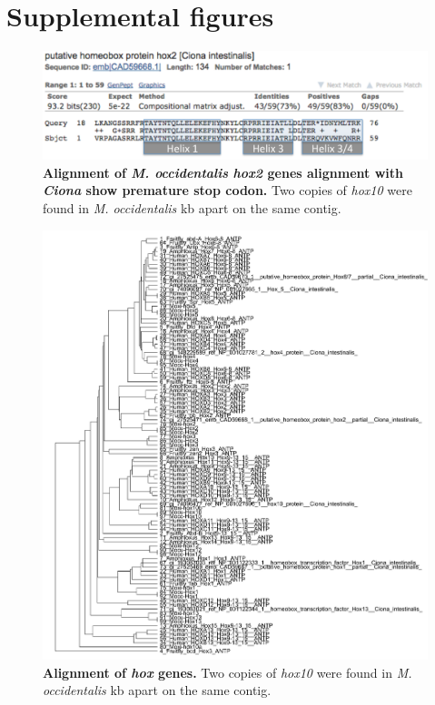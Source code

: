 \chapter{Supplemental figures}
\begin{figure}[thbp]
\centering
\includegraphics[scale=0.75]{figures/occi_hox2.pdf}
\caption{\textbf{Alignment of \textit{M. occidentalis} \textit{hox2} genes alignment with \textit{Ciona} show  premature stop codon.} Two copies of \textit{hox10} were found in \textit{M. occidentalis}  kb apart on the same contig.}
\label{fig:occihox2}
\end{figure}

\begin{figure}[tbp]
\centering
\includegraphics[scale=0.85]{figures/hox_alignment.pdf}
\caption{\textbf{Alignment of \textit{hox} genes.} Two copies of \textit{hox10} were found in \textit{M. occidentalis}  kb apart on the same contig.}
\label{fig:hox-alignments}
\end{figure}

